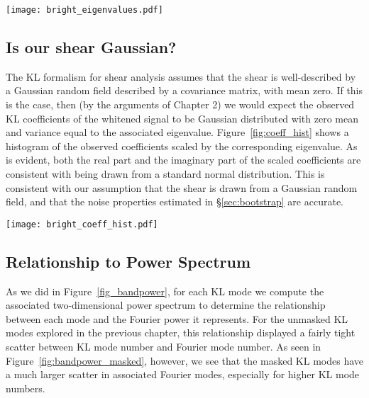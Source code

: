 \begin{figure*}
 \centering
 \texttt{[image: bright\_eigenvalues.pdf]}
 \caption[distribution of KL eigenvalues for COSMOS data]{
   The distribution of KL eigenvalues for the eigenmodes shown
   in Figure~\ref{fig:eigenmodes}.  There are $41 \times 40 = 1640$
   pixels, but approximately 90 of these contain no sources and are part of
   the mask.  This is reflected in the fact that the final 90 KL modes have
   zero eigenvalue.}
   \label{fig:eigenvalues}
\end{figure*}

\subsection{Is our shear Gaussian?}

The KL formalism for shear analysis assumes that the shear is well-described
by a Gaussian random field described by a covariance matrix, with mean
zero.  If this is the case, then (by the arguments of Chapter 2) we would
expect the observed KL coefficients of the whitened signal to be Gaussian
distributed with zero mean and variance equal to the associated eigenvalue.
Figure~\ref{fig:coeff_hist} shows a histogram of the observed coefficients
scaled by the corresponding eigenvalue.  As is evident, both the real
part and the imaginary part of the scaled coefficients are consistent with
being drawn from a standard normal distribution.  This is consistent with
our assumption that the shear is drawn from a Gaussian random field, and
that the noise properties estimated in \S\ref{sec:bootstrap} are accurate.

\begin{figure*}
 \centering
 \texttt{[image: bright\_coeff\_hist.pdf]}
 \caption[histogram of normalized coefficients for COSMOS data]{
   The histogram of normalized coefficients $a_i / \sqrt{\lambda_i}$.
   If the shear is truly a Gaussian random field, this distribution should
   be a Gaussian with unit variance.
   \label{fig:coeff_hist}}
\end{figure*}

\subsection{Relationship to Power Spectrum}
As we did in Figure~\ref{fig_bandpower}, for each KL mode we compute the
associated two-dimensional power spectrum to determine the relationship
between each mode and the Fourier power it represents.  For the unmasked
KL modes explored in the previous chapter, this relationship displayed a
fairly tight scatter between KL mode number and Fourier mode number.
As seen in Figure~\ref{fig:bandpower_masked}, however, we see that the
masked KL modes have a much larger scatter in associated Fourier modes,
especially for higher KL mode numbers.

